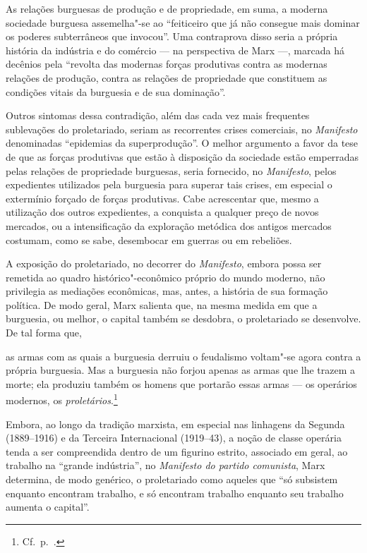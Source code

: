 As relações burguesas de produção e de propriedade, em suma, a moderna
sociedade burguesa assemelha"-se ao “feiticeiro que já não consegue mais
dominar os poderes subterrâneos que invocou”. Uma contraprova disso
seria a própria história da indústria e do comércio --- na perspectiva de
Marx ---, marcada há decênios pela “revolta das modernas forças
produtivas contra as modernas relações de produção, contra as relações
de propriedade que constituem as condições vitais da burguesia e de sua
dominação”.

Outros sintomas dessa contradição, além das cada vez mais frequentes
sublevações do proletariado, seriam as recorrentes crises comerciais,
no \textit{Manifesto} denominadas “epidemias da superprodução”. O
melhor argumento a favor da tese de que as forças produtivas que estão
à disposição da sociedade estão emperradas pelas relações de
propriedade burguesas, seria fornecido, no \textit{Manifesto}, pelos
expedientes utilizados pela burguesia para superar tais crises, em
especial o extermínio forçado de forças produtivas. Cabe acrescentar
que, mesmo a utilização dos outros expedientes, a conquista a qualquer
preço de novos mercados, ou a intensificação da exploração metódica dos
antigos mercados costumam, como se sabe, desembocar em guerras ou em
rebeliões.

A exposição do proletariado, no decorrer do \textit{Manifesto}, embora
possa ser remetida ao quadro histórico"-econômico próprio do mundo
moderno, não privilegia as mediações econômicas, mas, antes, a história
de sua formação política. De modo geral, Marx salienta que, na mesma
medida em que a burguesia, ou melhor, o capital também se desdobra, o
proletariado se desenvolve. De tal forma que,

\begin{hedraquote} 
as armas com as quais a burguesia derruiu o feudalismo voltam"-se agora
contra a própria burguesia. Mas a burguesia não forjou apenas as armas que
lhe trazem a morte; ela produziu também os homens que portarão essas
armas --- os operários modernos, os \textit{proletários}.\footnote{ Cf.~p.~\pageref{4}.}
\end{hedraquote} 

Embora, ao longo da tradição marxista, em especial nas linhagens da
Segunda (1889--1916) e da Terceira Internacional (1919--43), a noção de classe operária tenda
a ser compreendida dentro de um figurino estrito, associado em geral,
ao trabalho na “grande indústria”, no \textit{Manifesto do partido
comunista}, Marx determina, de modo genérico, o proletariado como
aqueles que “só subsistem enquanto encontram trabalho, e só encontram
trabalho enquanto seu trabalho aumenta o capital”. 

